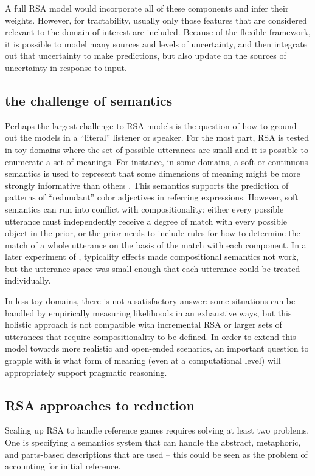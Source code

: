 \documentclass[]{article}
\begin{document}
A full RSA model would incorporate all of these components and infer their weights. However, for tractability, usually only those features that are considered relevant to the domain of interest are included. Because of the flexible framework, it is possible to model many sources and levels of uncertainty, and then integrate out that uncertainty to make predictions, but also update on the sources of uncertainty in response to input. 

\subsection{the challenge of semantics}
Perhaps the largest challenge to RSA models is the question of how to ground out the models in a ``literal'' listener or speaker. For the most part, RSA is tested in toy domains where the set of possible utterances are small and it is possible to enumerate a set of meanings. For instance, in some domains, a soft or continuous semantics is used to represent that some dimensions of meaning might be more strongly informative than others \cite{degen20200406}. This semantics supports the prediction of patterns of ``redundant'' color adjectives in referring expressions. However, soft semantics can run into conflict with compositionality: either every possible utterance must independently receive a degree of match with every possible object in the prior, or the prior needs to include rules for how to determine the match of a whole utterance on the basis of the match with each component. In a later experiment of \cite{degen20200406}, typicality effects made compositional semantics not work, but the utterance space was small enough that each utterance could be treated individually. 

 In less toy domains, there is not a satisfactory answer: some situations can be handled by empirically measuring likelihoods in an exhaustive ways, but this holistic approach is not compatible with incremental RSA or larger sets of utterances that require compositionality to be defined. In order to extend this model towards more realistic and open-ended scenarios, an important question to grapple with is what form of meaning (even at a computational level) will appropriately support pragmatic reasoning. 

\subsection{RSA approaches to reduction}
Scaling up RSA to handle reference games requires solving at least two problems. One is specifying a semantics system that can handle the abstract, metaphoric, and parts-based descriptions that are used -- this could be seen as the problem of accounting for initial reference. 
\end{document}

